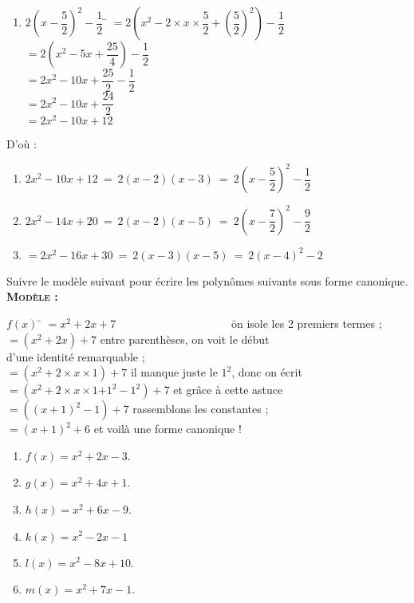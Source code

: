 \documentclass[a4paper,11pt,exos]{nsi} %
\begin{document}
\begin{multicols}{2}
\begin{enumerate}[label=\textbullet]
    \item \begin{tabbing}
        $2\left(x-\dfrac{5}{2}\right)^2-\dfrac{1}{2}$   \=  $=2\left(x^2-2\times x\times \dfrac{5}{2}+\left(\dfrac{5}{2}\right)^2\right)-\dfrac{1}{2}$\\[.5em]
        \>  $=2\left(x^2-5x+\dfrac{25}{4}\right)-\dfrac{1}{2}$\\[.5em]
        \>  $=2x^2-10x+\dfrac{25}{2}-\dfrac{1}{2}$\\[.5em]
        \>  $=2x^2-10x+\dfrac{24}{2}$\\[.5em]
        \>  $=2x^2-10x+12$
    \end{tabbing}
\end{enumerate}
\end{multicols}
D'où :
\begin{enumerate}[label=\textbullet]
    \item $2x^2-10x+12\ =\ 2(x-2)(x-3)\ =\ 2\left(x-\dfrac{5}{2}\right)^2-\dfrac{1}{2}$
    \item $2x^2-14x+20\ =\ 2(x-2)(x-5)\ =\ 2\left(x-\dfrac{7}{2}\right)^2-\dfrac{9}{2}$
    \item $=2x^2-16x+30\ = \ 2(x-3)(x-5)\ = \ 2\left(x-4\right)^2-2$
\end{enumerate}


\exo{}
\textcolor{UGLiBlue}{Suivre le modèle suivant pour écrire les polynômes suivants sous forme canonique.\\
\textbf{\textsc{Modèle :}}
\begin{tabbing}
	$f(x)$	\=	$=x^2+2x+7\qquad\qquad\qquad\qquad\qquad$				\=	on isole les 2 premiers termes ;\\
	\>	$=\left(x^2+2x\right)+7$						\>	entre parenthèses, on voit le début \\
	\>													\>	d'une identité remarquable ;\\
	\>	$=\left(x^2+2\times x\times 1\right)+7$			\>	il manque juste le $1^2$, donc on écrit\\
	\>	$=\left(x^2+2\times x\times 1\boxed{+1^2-1^2}\right)+7$						\>	et grâce à cette astuce\\
	\>	$=\left((x+1)^2-1\right)+7$						\>	rassemblons les constantes ;\\
	\>	$=(x+1)^2+6$									\>	et voilà une forme canonique !
\end{tabbing}
\begin{multicols}{3}
	\begin{enumerate}[label=\textbullet]
		\item 	$f(x)=x^2+2x-3$.
		\item 	$g(x)=x^2+4x+1$.
		\item 	$h(x)=x^2+6x-9$.
		\item 	$k(x)=x^2-2x-1$
		\item	$l(x)=x^2-8x+10$.
		\item 	$m(x)=x^2+7x-1$.
	\end{enumerate}
\end{multicols}}
\end{document}
